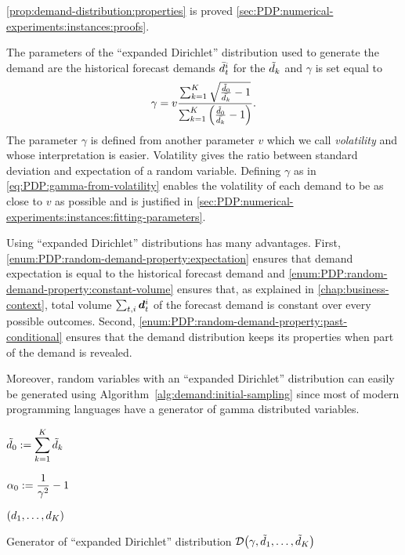 \cref{prop:demand-distribution:properties} is proved \cref{sec:PDP:numerical-experiments:instances:proofs}.


The parameters of the ``expanded Dirichlet'' distribution used to generate the demand are the historical forecast demands $\bar{d}_t^i$ for the $\tilde{d}_k$ and $\gamma$ is set equal to
\begin{equation}\label{eq:PDP:gamma-from-volatility}
  \gamma
  =
  v\frac
  {\sum_{k=1}^K\sqrt{\frac{\tilde{\demand}_0}{\bar{\demand_k}}-1}}
  {\sum_{k=1}^K\bracket{\frac{\tilde{\demand}_0}{\bar{\demand_k}}-1}}.
\end{equation}
The parameter $\gamma$ is defined from another parameter $v$ which we call \emph{volatility} and whose interpretation is easier.
Volatility gives the ratio between standard deviation and expectation of a random variable.
Defining $\gamma$ as in \cref{eq:PDP:gamma-from-volatility} enables the volatility of each demand to be as close to $v$ as possible and is justified in \cref{sec:PDP:numerical-experiments:instances:fitting-parameters}.


Using ``expanded Dirichlet'' distributions has many advantages.
First, \cref{enum:PDP:random-demand-property:expectation} ensures that demand expectation is equal to the historical forecast demand and \cref{enum:PDP:random-demand-property:constant-volume} ensures that, as explained in \cref{chap:business-context}, total volume $\sum_{t,i}\va\demand_t^i$ of the forecast demand is constant over every possible outcomes.
Second, \cref{enum:PDP:random-demand-property:past-conditional} ensures that the demand distribution keeps its properties when part of the demand is revealed.


Moreover, random variables with an ``expanded Dirichlet'' distribution can easily be generated using Algorithm~\ref{alg:demand:initial-sampling} since most of modern programming languages have a generator of gamma distributed variables.


\begin{algorithm}[H]

\BlankLine

$\displaystyle\tilde{d}_0:= \sum_{k=1}^K\tilde{d}_k$\;

$\displaystyle\alpha_0:= \frac{1}{\gamma^2}-1$\;




\BlankLine

\Return $\bracket{\demand_1,\ldots,\demand_K}$\;

\BlankLine
\caption{Generator of ``expanded Dirichlet'' distribution $\cD\bracket{\gamma,\tilde{\demand}_1,\ldots,\tilde{\demand}_K}$}
\label{alg:demand:initial-sampling}
\end{algorithm}


